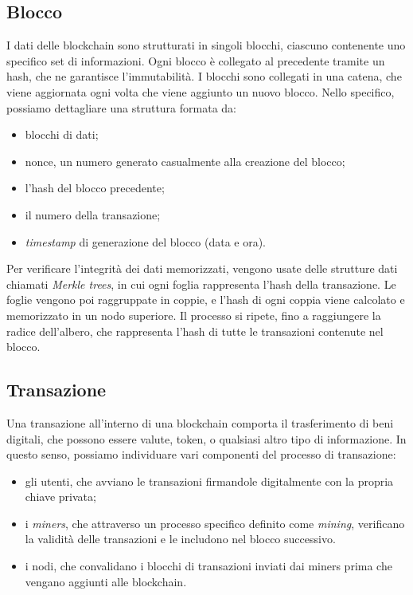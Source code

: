 \subsection{Blocco}\label{sec:tecnologie-blockchain-blocco}

I dati delle blockchain sono strutturati in singoli blocchi, ciascuno contenente uno specifico set di informazioni.
Ogni blocco è collegato al precedente tramite un hash, che ne garantisce l'immutabilità.
I blocchi sono collegati in una catena, che viene aggiornata ogni volta che viene aggiunto un nuovo blocco.
Nello specifico, possiamo dettagliare una struttura formata da:
\begin{itemize}
    \item blocchi di dati;
    \item nonce, un numero generato casualmente alla creazione del blocco;
    \item l'hash del blocco precedente;
    \item il numero della transazione;
    \item \textit{timestamp} di generazione del blocco (data e ora).
\end{itemize} 

Per verificare l'integrità dei dati memorizzati, vengono usate delle strutture dati chiamati \textit{Merkle trees}, in cui ogni foglia rappresenta l'hash della transazione.
Le foglie vengono poi raggruppate in coppie, e l'hash di ogni coppia viene calcolato e memorizzato in un nodo superiore.
Il processo si ripete, fino a raggiungere la radice dell'albero, che rappresenta l'hash di tutte le transazioni contenute nel blocco.

\subsection{Transazione}\label{sec:tecnologie-blockchain-transazione}

Una transazione all'interno di una blockchain comporta il trasferimento di beni digitali, che possono essere valute, token, o qualsiasi altro tipo di informazione.
In questo senso, possiamo individuare vari componenti del processo di transazione:
\begin{itemize}
    \item{gli utenti}, che avviano le transazioni firmandole digitalmente con la propria chiave privata;
    \item{i \textit{miners}}, che attraverso un processo specifico definito come \textit{mining}, verificano la validità delle transazioni e le includono nel blocco successivo. 
    \item{i nodi}, che convalidano i blocchi di transazioni inviati dai miners prima che vengano aggiunti alle blockchain.
\end{itemize}

